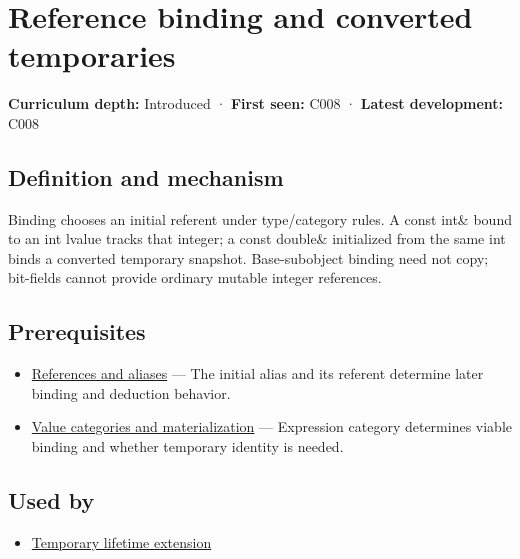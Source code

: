 \hypertarget{appendix-37856d997bb0}{}\label{referencestart:appendix-37856d997bb0}
\section{Reference binding and converted temporaries}\label{appendix-37856d997bb0-reference-binding-and-converted-temporaries}

\textbf{Curriculum depth:} Introduced · \textbf{First seen:} C008 · \textbf{Latest development:} C008

\begin{allmightroledefinition}

\subsection{Definition and mechanism}\label{appendix-37856d997bb0-definition-and-mechanism}

Binding chooses an initial referent under type/category rules. A const int\& bound to an int lvalue tracks that integer; a const double\& initialized from the same int binds a converted temporary snapshot. Base-subobject binding need not copy; bit-fields cannot provide ordinary mutable integer references.

\end{allmightroledefinition}

\subsection{Prerequisites}\label{appendix-37856d997bb0-prerequisites}

\begin{itemize}
\tightlist
\item
  \hyperref[appendix-d6d562ca9fbb]{References and aliases} --- The initial alias and its referent determine later binding and deduction behavior.
\item
  \hyperref[appendix-1121b30eaeb0]{Value categories and materialization} --- Expression category determines viable binding and whether temporary identity is needed.
\end{itemize}

\subsection{Used by}\label{appendix-37856d997bb0-used-by}

\begin{itemize}
\tightlist
\item
  \hyperref[appendix-a978b29bbbb0]{Temporary lifetime extension}
\end{itemize}

